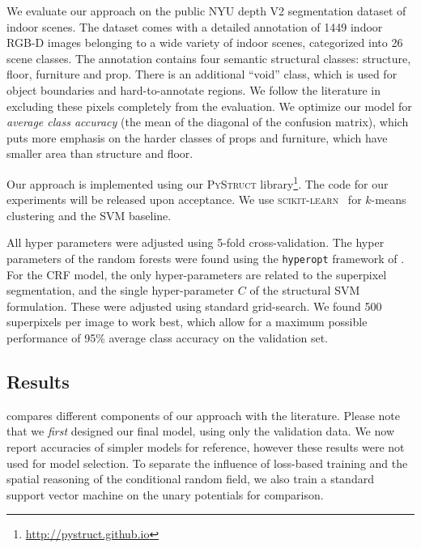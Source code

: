 \documentclass[a4paper, 10pt, conference]{ieeeconf}      %
\begin{document}
We evaluate our approach on the public NYU depth V2 segmentation dataset of
indoor scenes.  The dataset comes with a detailed annotation of 1449 indoor
RGB-D images belonging to a wide variety of indoor scenes, categorized into 26
scene classes.  The annotation contains four semantic structural classes:
structure, floor, furniture and prop. There is an additional ``void'' class,
which is used for object boundaries and hard-to-annotate regions. We follow the
literature in excluding these pixels completely from the evaluation.
We optimize our model for \emph{average class accuracy} (the mean of the
diagonal of the confusion matrix), which puts more emphasis on the harder
classes of props and furniture, which have smaller area than structure and
floor.

Our approach is implemented using our \textsc{PyStruct}
library\footnote{\url{http://pystruct.github.io}}.  The code for our
experiments will be released upon acceptance. We use \textsc{scikit-learn}~\citep{pedregosa2011scikit}
for $k$-means clustering and the SVM baseline.

All hyper parameters were adjusted using 5-fold cross-validation. The
hyper parameters of the random forests were found using the \texttt{hyperopt}
framework of \cite{bergstra2011algorithms}. For the CRF model, the only
hyper-parameters are related to the superpixel segmentation, and the single
hyper-parameter $C$ of the structural SVM formulation. These were adjusted
using standard grid-search.
We found 500 superpixels per image to work best, which allow for a maximum
possible performance of 95\% average class accuracy on the validation set.

\subsection{Results}
 compares different components of our approach with the literature.
Please note that we \emph{first} designed our final model, using only the
validation data. We now report accuracies of simpler models for reference,
however these results were not used for model selection. To separate
the influence of loss-based training and the spatial reasoning of the conditional random field,
we also train a standard support vector machine on the unary potentials for comparison.
\end{document}
